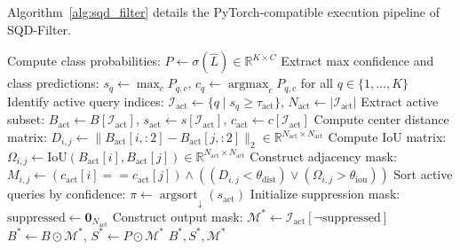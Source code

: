 \documentclass[preprint,12pt]{elsarticle}
\begin{document}
Algorithm~\ref{alg:sqd_filter} details the PyTorch-compatible execution pipeline of SQD-Filter.

\begin{algorithm}[!htbp]
\caption{Spatial Query Deduplication and Dispersion Filter (SQD-Filter)}
\label{alg:sqd_filter}
\DontPrintSemicolon
{}
\BlankLine
Compute class probabilities: $P \leftarrow \sigma(\hat{L}) \in \mathbb{R}^{K \times C}$\;
Extract max confidence and class predictions: $s_q \leftarrow \max_c P_{q, c}$, $c_q \leftarrow \operatorname{argmax}_c P_{q, c}$ for all $q \in \{1,\dots,K\}$\;
Identify active query indices: $\mathcal{I}_{\mathrm{act}} \leftarrow \{q \mid s_q \ge \tau_{\mathrm{act}}\}$, $N_{\mathrm{act}} \leftarrow |\mathcal{I}_{\mathrm{act}}|$\;
Extract active subset: $B_{\mathrm{act}} \leftarrow B[\mathcal{I}_{\mathrm{act}}]$, $s_{\mathrm{act}} \leftarrow s[\mathcal{I}_{\mathrm{act}}]$, $c_{\mathrm{act}} \leftarrow c[\mathcal{I}_{\mathrm{act}}]$\;
Compute center distance matrix: $D_{i, j} \leftarrow \|B_{\mathrm{act}}[i, :2] - B_{\mathrm{act}}[j, :2]\|_2 \in \mathbb{R}^{N_{\mathrm{act}} \times N_{\mathrm{act}}}$\;
Compute IoU matrix: $\Omega_{i, j} \leftarrow \mathrm{IoU}(B_{\mathrm{act}}[i], B_{\mathrm{act}}[j]) \in \mathbb{R}^{N_{\mathrm{act}} \times N_{\mathrm{act}}}$\;
Construct adjacency mask: $M_{i, j} \leftarrow (c_{\mathrm{act}}[i] == c_{\mathrm{act}}[j]) \land ((D_{i, j} < \theta_{\mathrm{dist}}) \lor (\Omega_{i, j} > \theta_{\mathrm{iou}}))$\;
Sort active queries by confidence: $\pi \leftarrow \operatorname{argsort}_{\downarrow}(s_{\mathrm{act}})$\;
Initialize suppression mask: $\mathrm{suppressed} \leftarrow \mathbf{0}_{N_{\mathrm{act}}}$\;
Construct output mask: $\mathcal{M}^* \leftarrow \mathcal{I}_{\mathrm{act}}[\neg \mathrm{suppressed}]$\;
$B^* \leftarrow B \odot \mathcal{M}^*$, $S^* \leftarrow P \odot \mathcal{M}^*$\;
\Return $B^*, S^*, \mathcal{M}^*$\;
\end{algorithm}
\end{document}

